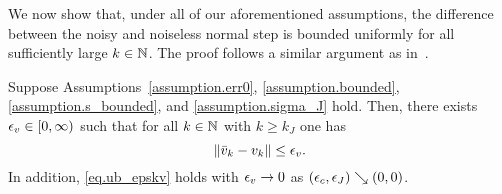 We now show that, under all of our aforementioned assumptions, the difference between the noisy and noiseless normal step is bounded uniformly for all sufficiently large $k \in \mathbb{N}$.  The proof follows a similar argument as in~\cite{BeraShiZhou}.

\begin{lemma}\label{lemma.ub_epskv}
  Suppose Assumptions~\ref{assumption.err0}, \ref{assumption.bounded}, \ref{assumption.s_bounded}, and \ref{assumption.sigma_J} hold.  Then, there exists $\epsilon_v \in [0, \infty)$ such that for all $k \in \mathbb{N}$ with $k \geq k_J$ one has
  \begin{equation}\label{eq.ub_epskv}
    \|{\bar v}_k - v_k\| \leq \epsilon_v.
  \end{equation}
  In addition, \eqref{eq.ub_epskv} holds with $\epsilon_v \to 0$ as $(\epsilon_c,\epsilon_J) \searrow (0,0)$.
\end{lemma}
